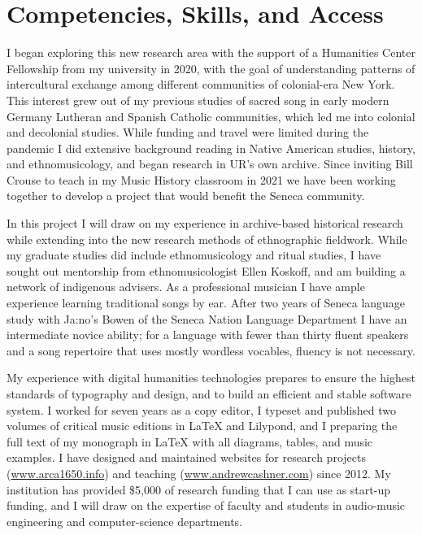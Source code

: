 \documentclass{neh}
\begin{document}
\section{Competencies, Skills, and Access}

I began exploring this new research area with the support of a Humanities
Center Fellowship from my university in 2020, with the goal of understanding
patterns of intercultural exchange among different communities of colonial-era
New York.
This interest grew out of my previous studies of sacred song in early modern
Germany Lutheran and Spanish Catholic communities, which led me into colonial
and decolonial studies.
While funding and travel were limited during the pandemic I did extensive
background reading in Native American studies, history, and ethnomusicology,
and began research in UR's own archive.
Since inviting Bill Crouse to teach in my Music History classroom in 2021 we
have been working together to develop a project that would benefit the Seneca
community.

In this project I will draw on my experience in archive-based historical
research while extending into the new research methods of ethnographic
fieldwork.
While my graduate studies did include ethnomusicology and ritual studies, I have
sought out mentorship from ethnomusicologist Ellen Koskoff, and am
building a network of indigenous advisers.
As a professional musician I have ample experience learning traditional songs
by ear.
After two years of Seneca language study with Ja:no’s Bowen of the Seneca
Nation Language Department I have an intermediate novice ability; for a
language with fewer than thirty fluent speakers and a song repertoire that
uses mostly wordless vocables, fluency is not necessary.

My experience with digital humanities technologies prepares to ensure the
highest standards of typography and design, and to build an efficient and
stable software system.
I worked for seven years as a copy editor, I typeset and published two volumes
of critical music editions in \LaTeX{} and Lilypond, and I preparing the full
text of my monograph in \LaTeX{} with all diagrams, tables, and music
examples.
I have designed and maintained websites for research projects
(\url{www.arca1650.info}) and teaching (\url{www.andrewcashner.com}) since
2012.
My institution has provided \$5,000 of research funding that I can use as
start-up funding, and I will draw on the expertise of faculty and students in
audio-music engineering and computer-science departments.
\end{document}
